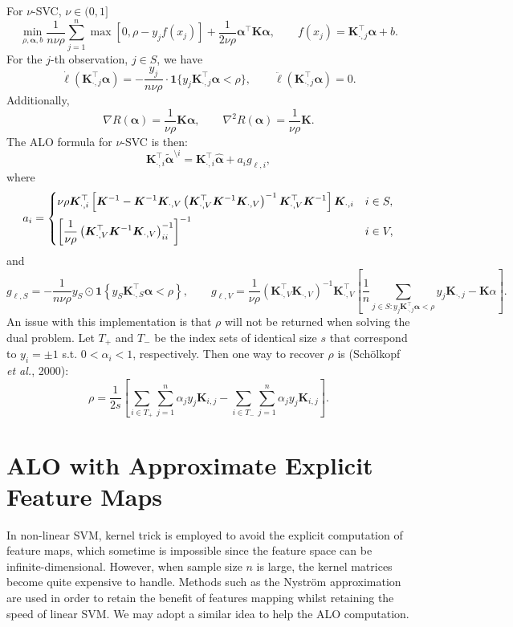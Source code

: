 \documentclass[11pt]{article}
\newcommand{\bK}{\bm{K}}
\newcommand{\balpha}{\bm{\alpha}}
\begin{document}
For \(\nu\)-SVC, \(\nu\in(0,1]\)
\begin{equation}
\min_{\rho,\balpha, b}\frac{1}{n\nu\rho}\sum_{j=1}^{n}\max\left[0, \rho-y_jf(x_j)\right]+\frac{1}{2\nu\rho}\balpha^\top\bK\balpha, \qquad f(x_j)=\bK_{\cdot,j}^\top\balpha+b.
\end{equation}
For the \(j\)-th observation, \(j\in S\), we have \[\dot{\ell}(\bK_{\cdot,j}^\top\balpha)=-\frac{y_j}{n\nu\rho}\cdot\bm{1}\{y_j\bK_{\cdot,j}^\top\balpha<\rho\},\qquad\ddot{\ell}(\bK_{\cdot,j}^\top\balpha)=0.\] Additionally, \[\nabla R(\balpha)=\frac{1}{\nu\rho}\bK\balpha,\qquad\nabla^2R(\balpha)=\frac{1}{\nu\rho}\bK.\] The ALO formula for \(\nu\)-SVC is then: \[\bK_{\cdot,i}^\top\tilde{\balpha}^{\setminus i}=\bK_{\cdot,i}^\top\hat{\balpha}+a_ig_{\ell,i},\] where \[a_i=\begin{dcases}
\nu\rho\bK_{\cdot,i}^\top\left[\bK^{-1}-\bK^{-1}\bK_{\cdot,V}\left(\bK_{\cdot,V}^\top\bK^{-1}\bK_{\cdot,V}\right)^{-1}\bK_{\cdot,V}^\top\bK^{-1}\right]\bK_{\cdot,i} & i\in S,\\
\left[\frac{1}{\nu\rho}\left(\bK_{\cdot,V}^\top\bK^{-1}\bK_{\cdot,V}\right)^{-1}_{ii}\right]^{-1} & i\in V,
\end{dcases}\] and \[g_{\ell, S}=-\frac{1}{n\nu\rho}y_S\odot\bm{1}\left\{y_S\bK_{\cdot,S}^\top\balpha<\rho\right\},\qquad g_{\ell, V}=\frac{1}{\nu\rho}\left(\bK_{\cdot,V}^\top\bK_{\cdot,V}\right)^{-1}\bK_{\cdot,V}^\top\left[\frac{1}{n}\sum_{j\in S:y_j\bK_{\cdot,j}^\top\balpha<\rho}y_j\bK_{\cdot,j}-\bK\alpha\right].\] An issue with this implementation is that \(\rho\) will not be returned when solving the dual problem. Let \(T_+\) and \(T_-\) be the index sets of identical size \(s\) that correspond to \(y_i=\pm1\) s.t. \(0<\alpha_i<1\), respectively. Then one way to recover \(\rho\) is (Sch\"{o}lkopf \emph{et al.}, 2000): \[\rho=\frac{1}{2s}\left[\sum_{i\in T_+}\sum_{j=1}^n\alpha_jy_j\bK_{i,j}-\sum_{i\in T_-}\sum_{j=1}^n\alpha_jy_j\bK_{i,j}\right].\]
\section{ALO with Approximate Explicit Feature Maps}
In non-linear SVM, kernel trick is employed to avoid the explicit computation of feature maps, which sometime is impossible since the feature space can be infinite-dimensional. However, when sample size \(n\) is large, the kernel matrices become quite expensive to handle. Methods such as the Nystr\"{o}m approximation are used in order to retain the benefit of features mapping whilst retaining the speed of linear SVM. We may adopt a similar idea to help the ALO computation.
\end{document}
